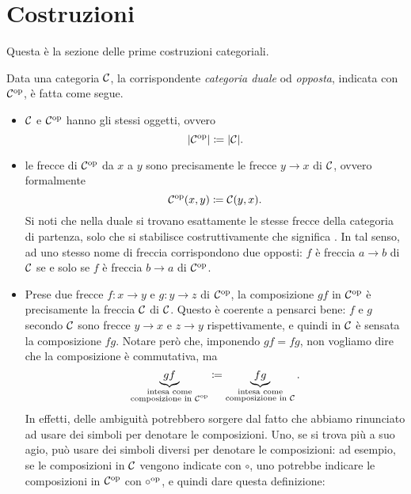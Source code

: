 
\section{Costruzioni}

Questa è la sezione delle prime costruzioni categoriali.

\begin{costruzione}\label{costr:DualCat}
Data una categoria \(\mathcal C\), la corrispondente {\em categoria duale} od {\em opposta}, indicata con \(\mathcal C^\text{op}\), è fatta come segue.

\begin{itemize}
\item \(\mathcal C\) e \(\mathcal C^\text{op}\) hanno gli stessi oggetti, ovvero
\[\lvert\mathcal C^\text{op}\rvert \coloneq \lvert\mathcal C\rvert .\]
\item le frecce di \(\mathcal C^\text{op}\) da \(x\) a \(y\) sono precisamente le frecce \(y \to x\) di \(\mathcal C\), ovvero formalmente
\[\mathcal C^\text{op}(x, y) \coloneq \mathcal C(y, x) .\]
Si noti che nella duale si trovano esattamente le stesse frecce della categoria di partenza, solo che si stabilisce costruttivamente che  significa . In tal senso, ad uno stesso nome di freccia corrispondono due  opposti: \(f\) è freccia \(a \to b\) di \(\mathcal C\) se e solo se \(f\) è freccia \(b \to a\) di \(\mathcal C^\text{op}\).
\item Prese due frecce \(f : x \to y\) e \(g : y \to z\) di \(\mathcal C^\text{op}\), la composizione \(gf\) in \(\mathcal C^\text{op}\) è precisamente la freccia \(\mathcal C\) di \(\mathcal C\). Questo è coerente a pensarci bene: \(f\) e \(g\) secondo \(\mathcal C\) sono frecce \(y \to x\) e \(z \to y\) rispettivamente, e quindi in \(\mathcal C\) è sensata la composizione \(fg\). Notare però che, imponendo \(gf = fg\), non vogliamo dire che la composizione è commutativa, ma
\[\underbrace{gf}_{\substack{\text{intesa come} \\ \text{composizione in } \mathcal C^\text{op}}} \coloneq \underbrace{fg}_{\substack{\text{intesa come} \\ \text{composizione in } \mathcal C}} .\]
In effetti, delle ambiguità potrebbero sorgere dal fatto che abbiamo rinunciato ad usare dei simboli per denotare le composizioni. Uno, se si trova più a suo agio, può usare dei simboli diversi per denotare le composizioni: ad esempio, se le composizioni in \(\mathcal C\) vengono indicate con \(\circ\), uno potrebbe indicare le composizioni in \(\mathcal C^\text{op}\) con \(\circ^\text{op}\), e quindi dare questa definizione:

\end{itemize}
\end{costruzione}

